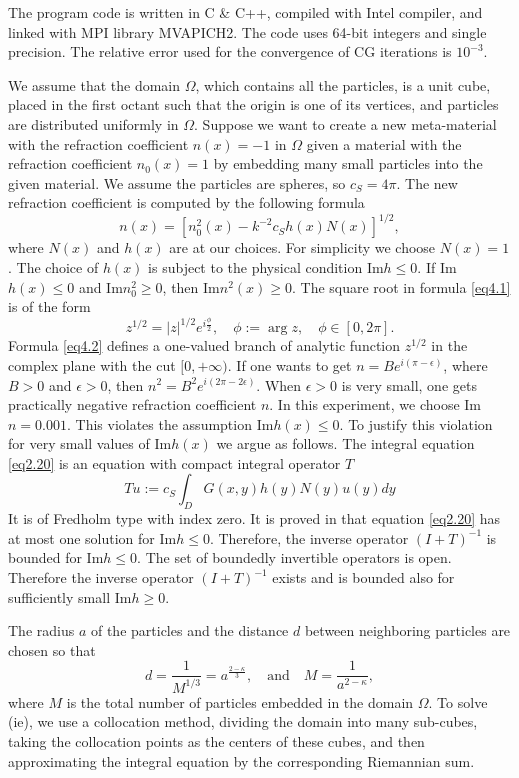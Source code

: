 \documentclass[12pt]{elsarticle}
\numberwithin{equation}{section}
\newcommand{\be}{\begin{equation}}
\newcommand{\ee}{\end{equation}}
\begin{document}
The program code is written in C \& C++, compiled with Intel compiler, and linked with MPI library MVAPICH2. The code uses 64-bit integers and single precision. The relative error used for the convergence of CG iterations is $10^{-3}$.

We assume that the domain $\Omega$, which contains all the particles, is a unit cube, placed in the first octant such that the origin is one of its vertices, and particles are distributed uniformly in $\Omega$. Suppose we want to create a new meta-material with the refraction coefficient $n(x)=-1$ in $\Omega$  given a material with the refraction coefficient $n_0(x)=1$ by embedding many small particles into the given material. We assume the particles are spheres, so $c_S=4\pi$. The new refraction coefficient is computed by the following formula
\be \label{eq4.1}
	n(x)=[n_0^2(x)-k^{-2}c_Sh(x)N(x)]^{1/2},
\ee
where $N(x)$ and $h(x)$ are at our choices. For simplicity we choose $N(x)=1$. The choice of $h(x)$ is subject to the physical condition
Im$h\le 0$. If Im$h(x) \le 0$ and Im$n_0^2\ge 0$, then Im$n^2(x) \ge 0$.
The square root in formula \eqref{eq4.1} is of the form
\be \label{eq4.2}
	z^{1/2}=|z|^{1/2}e^{i\frac{\phi}{2}}, \quad \phi :=\arg z, \quad \phi \in [0,2\pi].
\ee
Formula \eqref{eq4.2} defines a one-valued branch of analytic function $z^{1/2}$ in the complex plane  with the cut $[0, +\infty)$.
If one wants to get $n=Be^{i(\pi -\epsilon)}$, where $B>0$ and $\epsilon>0$, then $n^2=B^2e^{i(2\pi-2\epsilon)}$.
When $\epsilon >0$ is very small, one gets practically negative refraction coefficient $n$.
In this experiment, we choose Im$n=0.001$. This violates the assumption  Im$h(x) \le 0$. To justify this violation for very small
values of  Im$h(x)$ we argue as follows.
The integral equation \eqref{eq2.20} is an equation with compact integral operator $T$
\be
	Tu:=c_S\int_D G(x,y)h(y)N(y)u(y)dy
\ee
It is of Fredholm type with index zero. It is proved in \cite{R635} that equation \eqref{eq2.20}
 has at most one solution for Im$h\le 0$. Therefore, the inverse operator $(I+T)^{-1}$ is bounded for  Im$h\le 0$.
 The set of boundedly invertible operators is open. Therefore   the inverse operator $(I+T)^{-1}$
 exists and is bounded also for sufficiently small Im$h\ge 0$.

The radius $a$ of the particles and the distance $d$ between neighboring particles are chosen so that
\be \label{eq4.3}
    d=\frac{1}{M^{1/3}}=a^{\frac{2-\kappa}{3}}, \quad\text{and}\quad M=\frac{1}{a^{2-\kappa}},
\ee
where $M$ is the total number of particles embedded in the domain $\Omega$. To solve (ie), we use  a collocation method, dividing the domain into many sub-cubes, taking the collocation points as the centers of these cubes, and then approximating the integral equation by the corresponding Riemannian sum.
\end{document}
